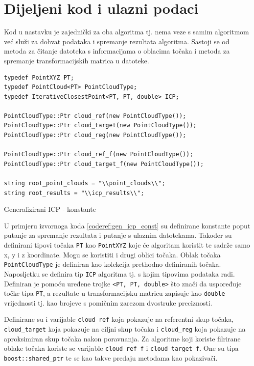\section{Dijeljeni kod i ulazni podaci}

Kod u nastavku je zajednički za oba algoritma tj. nema veze s samim algoritmom već služi za dohvat podataka i spremanje rezultata algoritma. Sastoji se od metoda za čitanje datoteka s informacijama o oblacima točaka i metoda za spremanje transformacijskih matrica u datoteke. 

\begin{listing}[h!]
  \begin{verbatim}
typedef PointXYZ PT;
typedef PointCloud<PT> PointCloudType;
typedef IterativeClosestPoint<PT, PT, double> ICP;

PointCloudType::Ptr cloud_ref(new PointCloudType());
PointCloudType::Ptr cloud_target(new PointCloudType());
PointCloudType::Ptr cloud_reg(new PointCloudType());

PointCloudType::Ptr cloud_ref_f(new PointCloudType());
PointCloudType::Ptr cloud_target_f(new PointCloudType());

string root_point_clouds = "\\point_clouds\\";
string root_results = "\\icp_results\\";
  \end{verbatim}
  \caption{Generalizirani ICP - konstante}
  \label{coderef:gen_icp_const}
\end{listing}

U primjeru izvornoga koda \ref{coderef:gen_icp_const} su definirane konstante poput putanje za spremanje rezultata i putanje s ulaznim datotekama. Također su definirani tipovi točaka \texttt{PT} kao \texttt{PointXYZ} koje će algoritam koristit te sadrže samo x, y i z koordinate. Mogu se koristiti i drugi oblici točaka. Oblak točaka \texttt{PointCloudType} je definiran kao kolekcija prethodno definiranih točaka. Naposljetku se definira tip \texttt{ICP} algoritma tj. s kojim tipovima podataka radi. Definiran je pomoću uređene trojke \texttt{<PT, PT, double>} što znači da uspoređuje točke tipa \texttt{PT}, a rezultate u transformacijsku matricu zapisuje kao \texttt{double} vrijednosti tj. kao brojeve s pomičnim zarezom dvostruke preciznosti.

Definirane su i varijable \texttt{cloud_ref} koja pokazuje na referentni skup točaka, \texttt{cloud_target} koja pokazuje na ciljni skup točaka i \texttt{cloud_reg} koja pokazuje na aproksimiran skup točaka nakon poravnanja. Za algoritme koji koriste filrirane oblake točaka koriste se varijable \texttt{cloud_ref_f} i \texttt{cloud_target_f}. One su tipa \texttt{boost::shared_ptr} te se kao takve predaju metodama kao pokazivači.

